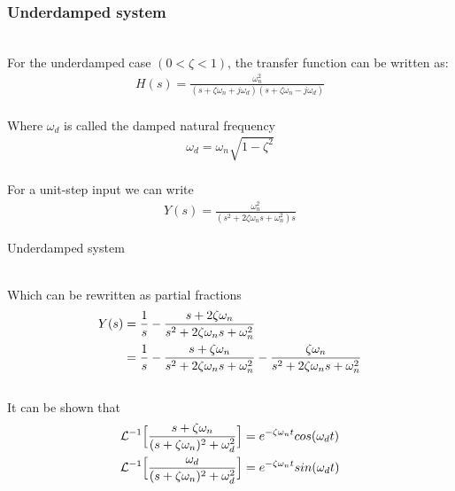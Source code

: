 \begin{frame}
\frametitle{Underdamped system}
\\For the underdamped case $(0< \zeta< 1)$, the transfer function can be written as:\\ 
\begin{align*}
H(s)=\frac{\omega_n ^2}{(s+\zeta\omega_n+j\omega_d)(s+\zeta\omega_n-j\omega_d)}
\end{align*}
\pause
\\Where $\omega_d$ is called the damped natural frequency
\\ 
\begin{align*}
\omega_d = \omega_n\sqrt{1-\zeta^2}
\end{align*}
\pause
\\ For a unit-step input we can write
\\ 
\begin{align*}
Y(s)=\frac{\omega_n ^2}{(s^2+2\zeta\omega_n s+\omega_n ^2)s}
\end{align*}
\end{frame}

\begin{frame}{Underdamped system}

\\ Which can be rewritten as partial fractions\\
\vspace{-0.5cm}
\begin{align*}
Y(s)&=\frac{1}{s} -\frac{s+2\zeta\omega_n}{s^2+2\zeta\omega_n s+ \omega_n ^2} \\ \vspace{2cm}
&= \frac{1}{s} -\frac{s+\zeta\omega_n}{s^2+2\zeta\omega_n s+ \omega_n ^2} -\frac{\zeta\omega_n}{s^2+2\zeta\omega_n s+ \omega_n ^2}
\end{align*}
\pause
\\ It can be shown that
\\ 
\begin{align*}
\mathcal{L}^{-1}\Big[\frac{s+\zeta\omega_n}{(s+\zeta\omega_n)^2+\omega_d ^2}\Big]&= e^{-\zeta\omega_n t}cos(\omega_d t)\\  \vspace{2cm}
\mathcal{L}^{-1}\Big[\frac{\omega_d}{(s+\zeta\omega_n)^2+\omega_d ^2}\Big]&= e^{-\zeta\omega_n t}sin(\omega_d t)
\end{align*}
\end{frame}



